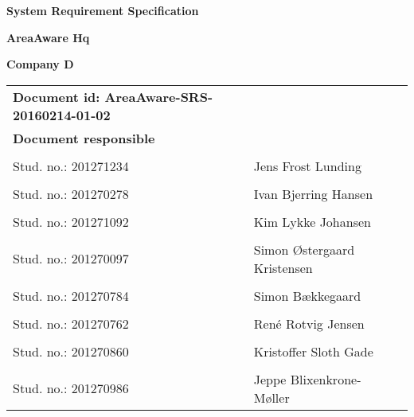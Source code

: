 
\centerline{\Huge\bfseries\color{ThemeColor} System Requirement Specification } 

\vspace{1em}
\centerline{\Large\bfseries\color{BlackColor} AreaAware Hq} 

\vspace{5em}
\centerline{\large\bfseries\color{BlackColor}Company D} 




\begin{center}
	\begin{tabular}{ l l l }
		\textbf{Document id: AreaAware-SRS-20160214-01-02}& & \\
		\textbf{Document responsible}& & \\
		& & \\
		Stud. no.:  201271234 & Jens Frost Lunding & \\\hline
		& & \\
		Stud. no.:  201270278 & Ivan Bjerring Hansen & \\\hline
		& & \\
		Stud. no.:  201271092 & Kim Lykke Johansen & \\\hline
		& & \\	
		Stud. no.:  201270097 & Simon Østergaard Kristensen & \\\hline
		& & \\
		Stud. no.:  201270784 & Simon Bækkegaard & \\\hline
		& & \\
		Stud. no.: 	201270762 & René Rotvig Jensen & \\\hline
		& & \\
		Stud. no.: 	201270860 & Kristoffer Sloth Gade & \\\hline
		& & \\
		Stud. no.: 	201270986 & Jeppe Blixenkrone-Møller & \\\hline
	\end{tabular}     	
\end{center}
\thispagestyle{empty} %
\restoregeometry



		